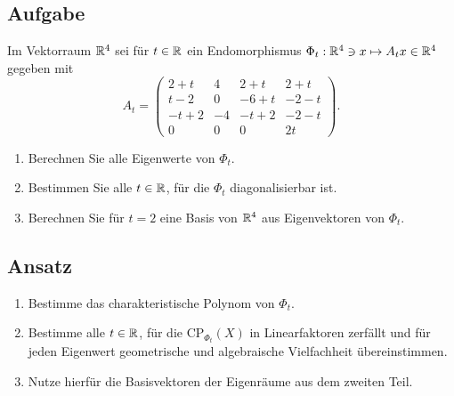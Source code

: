 \subsection{Aufgabe}
Im Vektorraum \( \mathbb{R}^4 \) sei für \( t \in \mathbb{R} \) ein Endomorphismus \( \Phi_t: \mathbb{R}^4 \ni x \mapsto A_tx \in \mathbb{R}^4 \) gegeben mit
\begin{equation*}
	A_t = \begin{pmatrix}
		2+t & 4 & 2+t & 2+t \\
		t-2 & 0 & -6+t & -2-t \\
		-t+2 & -4 & -t+2 & -2-t \\
		0 & 0 & 0 & 2t
	\end{pmatrix}\text{.}
\end{equation*}
\begin{enumerate}
	\item Berechnen Sie alle Eigenwerte von \( \Phi_t \).
	\item Bestimmen Sie alle \( t \in \mathbb{R} \), für die \( \Phi_t \) diagonalisierbar ist.
	\item Berechnen Sie für \( t = 2 \) eine Basis von \( \mathbb{R}^4 \) aus Eigenvektoren von \( \Phi_t \).  
\end{enumerate}

\subsection{Ansatz}
\begin{enumerate}
	\item Bestimme das charakteristische Polynom von \( \Phi_t \).
	\item Bestimme alle \( t \in \mathbb{R} \), für die \( \text{CP}_{\Phi_t}(X) \) in Linearfaktoren zerfällt und für jeden Eigenwert geometrische und algebraische Vielfachheit übereinstimmen.
	\item Nutze hierfür die Basisvektoren der Eigenräume aus dem zweiten Teil. 
\end{enumerate}

